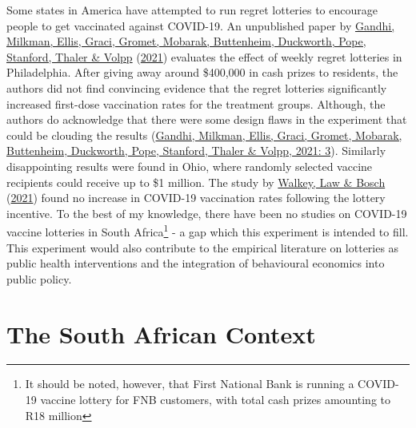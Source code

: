 \documentclass[11pt,preprint, authoryear]{elsarticle}
\numberwithin{equation}{section}
\numberwithin{figure}{section}
\numberwithin{table}{section}
\let\rmarkdownfootnote\footnote%
\def\footnote{\protect\rmarkdownfootnote}
\begin{document}
Some states in America have attempted to run regret lotteries to
encourage people to get vaccinated against COVID-19. An unpublished
paper by \protect\hyperlink{ref-duck}{Gandhi, Milkman, Ellis, Graci,
Gromet, Mobarak, Buttenheim, Duckworth, Pope, Stanford, Thaler \& Volpp}
(\protect\hyperlink{ref-duck}{2021}) evaluates the effect of weekly
regret lotteries in Philadelphia. After giving away around \$400,000 in
cash prizes to residents, the authors did not find convincing evidence
that the regret lotteries significantly increased first-dose vaccination
rates for the treatment groups. Although, the authors do acknowledge
that there were some design flaws in the experiment that could be
clouding the results (\protect\hyperlink{ref-duck}{Gandhi, Milkman,
Ellis, Graci, Gromet, Mobarak, Buttenheim, Duckworth, Pope, Stanford,
Thaler \& Volpp, 2021: 3}). Similarly disappointing results were found
in Ohio, where randomly selected vaccine recipients could receive up to
\$1 million. The study by \protect\hyperlink{ref-ohio}{Walkey, Law \&
Bosch} (\protect\hyperlink{ref-ohio}{2021}) found no increase in
COVID-19 vaccination rates following the lottery incentive. To the best
of my knowledge, there have been no studies on COVID-19 vaccine
lotteries in South Africa\footnote{It should be noted, however, that
  First National Bank is running a COVID-19 vaccine lottery for FNB
  customers, with total cash prizes amounting to R18 million} - a gap
which this experiment is intended to fill. This experiment would also
contribute to the empirical literature on lotteries as public health
interventions and the integration of behavioural economics into public
policy.

\hypertarget{the-south-african-context}{%
\section{\texorpdfstring{The South African Context
\label{context}}{The South African Context }}\label{the-south-african-context}}
\end{document}
